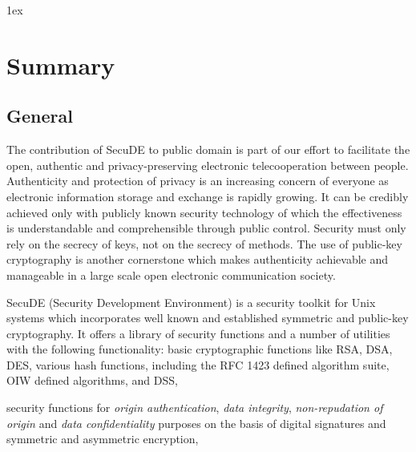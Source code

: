 \parskip 1ex


\def\authors{
Edited by Wolfgang Schneider \\ \\
}



\pagestyle{plain}
\tableofcontents

\cleardoublepage


\pagestyle{myheadings}
\thispagestyle{myheadings}

\section{Summary}
\subsection{General}
The contribution of SecuDE to public domain is part of our effort to 
facilitate the open, authentic and privacy-preserving electronic 
telecooperation between people.  
Authenticity and protection of privacy is an increasing concern of 
everyone as electronic information storage and exchange is rapidly 
growing. It can be credibly achieved only with publicly known
security technology of which the effectiveness is understandable and 
comprehensible through public control. 
Security must only rely on the secrecy of keys, not on the secrecy of methods.
The use of public-key cryptography is another cornerstone which
makes authenticity achievable and manageable in a large scale open 
electronic communication society. 

SecuDE (Security Development Environment) is a security toolkit for
Unix systems which incorporates well known and established symmetric
and public-key cryptography. 
It offers a library of security functions and a
number of utilities with the following functionality:
\bi
\m basic cryptographic functions like RSA, DSA, DES, various hash functions, 
   including the RFC 1423 defined algorithm suite, 
   OIW defined algorithms, and DSS,

\m security functions for {\em origin authentication}, {\em data integrity}, 
   {\em non-repudation of origin} and {\em data confidentiality} purposes 
   on the basis of digital signatures and symmetric and asymmetric encryption,

